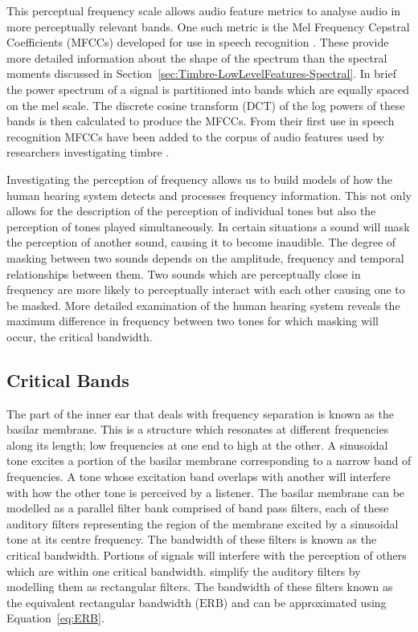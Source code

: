 		This perceptual frequency scale allows audio feature metrics to analyse audio in more perceptually relevant
		bands. One such metric is the Mel Frequency Cepstral Coefficients (MFCCs) developed for use in speech
		recognition \citep{davis1980comparison}. These provide more detailed information about the shape of the
		spectrum than the spectral moments discussed in Section~\ref{sec:Timbre-LowLevelFeatures-Spectral}. In
		brief the power spectrum of a signal is partitioned into bands which are equally spaced on the mel scale.
		The discrete cosine transform (DCT) of the log powers of these bands is then calculated to produce the
		MFCCs. From their first use in speech recognition MFCCs have been added to the corpus of audio features
		used by researchers investigating timbre \citep{depoli1997sonological}. 

		Investigating the perception of frequency allows us to build models of how the human hearing system detects
		and processes frequency information. This not only allows for the description of the perception of
		individual tones but also the perception of tones played simultaneously. In certain situations a sound will
		mask the perception of another sound, causing it to become inaudible. The degree of masking between two
		sounds depends on the amplitude, frequency and temporal relationships between them. Two sounds which are
		perceptually close in frequency are more likely to perceptually interact with each other causing one to be
		masked. More detailed examination of the human hearing system reveals the maximum difference in frequency
		between two tones for which masking will occur, the critical bandwidth.

	\subsection{Critical Bands}
	\label{sec:Timbre-PsychoacousticPrinciples-CriticalBands}
		The part of the inner ear that deals with frequency separation is known as the basilar membrane. This is a
		structure which resonates at different frequencies along its length; low frequencies at one end to high at
		the other. A sinusoidal tone excites a portion of the basilar membrane corresponding to a narrow band of
		frequencies. A tone whose excitation band overlaps with another will interfere with how the other tone is
		perceived by a listener. The basilar membrane can be modelled as a parallel filter bank comprised of band
		pass filters, each of these auditory filters representing the region of the membrane excited by a
		sinusoidal tone at its centre frequency. The bandwidth of these filters is known as the critical bandwidth.
		Portions of signals will interfere with the perception of others which are within one critical bandwidth.
		\citet{glasberg1990derivation} simplify the auditory filters by modelling them as rectangular filters. The
		bandwidth of these filters known as the equivalent rectangular bandwidth ($\mathrm{ERB}$) and can be
		approximated using Equation~\ref{eq:ERB}.

